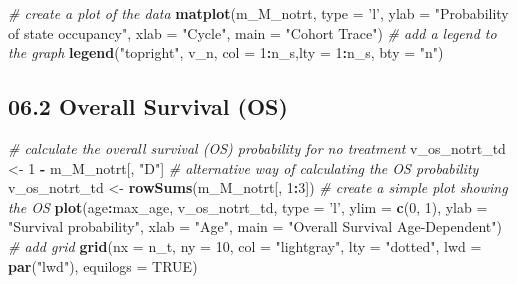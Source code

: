 \documentclass[
]{article}
\newenvironment{Shaded}{\begin{snugshade}}{\end{snugshade}}
\newcommand{\CommentTok}[1]{\textcolor[rgb]{0.56,0.35,0.01}{\textit{#1}}}
\newcommand{\DataTypeTok}[1]{\textcolor[rgb]{0.13,0.29,0.53}{#1}}
\newcommand{\DecValTok}[1]{\textcolor[rgb]{0.00,0.00,0.81}{#1}}
\newcommand{\KeywordTok}[1]{\textcolor[rgb]{0.13,0.29,0.53}{\textbf{#1}}}
\newcommand{\NormalTok}[1]{#1}
\newcommand{\OperatorTok}[1]{\textcolor[rgb]{0.81,0.36,0.00}{\textbf{#1}}}
\newcommand{\OtherTok}[1]{\textcolor[rgb]{0.56,0.35,0.01}{#1}}
\newcommand{\StringTok}[1]{\textcolor[rgb]{0.31,0.60,0.02}{#1}}
\begin{document}
\begin{Shaded}
\begin{Highlighting}[]
\CommentTok{# create a plot of the data}
\KeywordTok{matplot}\NormalTok{(m_M_notrt, }\DataTypeTok{type =} \StringTok{'l'}\NormalTok{, }
        \DataTypeTok{ylab =} \StringTok{"Probability of state occupancy"}\NormalTok{,}
        \DataTypeTok{xlab =} \StringTok{"Cycle"}\NormalTok{,}
        \DataTypeTok{main =} \StringTok{"Cohort Trace"}\NormalTok{)                   }
\CommentTok{# add a legend to the graph }
\KeywordTok{legend}\NormalTok{(}\StringTok{"topright"}\NormalTok{, v_n, }\DataTypeTok{col =} \DecValTok{1}\OperatorTok{:}\NormalTok{n_s,}\DataTypeTok{lty =} \DecValTok{1}\OperatorTok{:}\NormalTok{n_s, }\DataTypeTok{bty =} \StringTok{"n"}\NormalTok{)  }
\end{Highlighting}
\end{Shaded}

\hypertarget{overall-survival-os}{%
\subsection{06.2 Overall Survival (OS)}\label{overall-survival-os}}

\begin{Shaded}
\begin{Highlighting}[]
\CommentTok{# calculate the overall survival (OS) probability for no treatment}
\NormalTok{v_os_notrt_td <-}\StringTok{ }\DecValTok{1} \OperatorTok{-}\StringTok{ }\NormalTok{m_M_notrt[, }\StringTok{"D"}\NormalTok{]         }
\CommentTok{# alternative way of calculating the OS probability   }
\NormalTok{v_os_notrt_td <-}\StringTok{ }\KeywordTok{rowSums}\NormalTok{(m_M_notrt[, }\DecValTok{1}\OperatorTok{:}\DecValTok{3}\NormalTok{])    }
\CommentTok{# create a simple plot showing the OS}
\KeywordTok{plot}\NormalTok{(age}\OperatorTok{:}\NormalTok{max_age, v_os_notrt_td, }\DataTypeTok{type =} \StringTok{'l'}\NormalTok{, }
     \DataTypeTok{ylim =} \KeywordTok{c}\NormalTok{(}\DecValTok{0}\NormalTok{, }\DecValTok{1}\NormalTok{),}
     \DataTypeTok{ylab =} \StringTok{"Survival probability"}\NormalTok{,}
     \DataTypeTok{xlab =} \StringTok{"Age"}\NormalTok{,}
     \DataTypeTok{main =} \StringTok{"Overall Survival Age-Dependent"}\NormalTok{)   }
\CommentTok{# add grid}
\KeywordTok{grid}\NormalTok{(}\DataTypeTok{nx =}\NormalTok{ n_t, }\DataTypeTok{ny =} \DecValTok{10}\NormalTok{, }\DataTypeTok{col =} \StringTok{"lightgray"}\NormalTok{, }\DataTypeTok{lty =} \StringTok{"dotted"}\NormalTok{, }\DataTypeTok{lwd =} \KeywordTok{par}\NormalTok{(}\StringTok{"lwd"}\NormalTok{), }
     \DataTypeTok{equilogs =} \OtherTok{TRUE}\NormalTok{) }
\end{Highlighting}
\end{Shaded}
\end{document}
